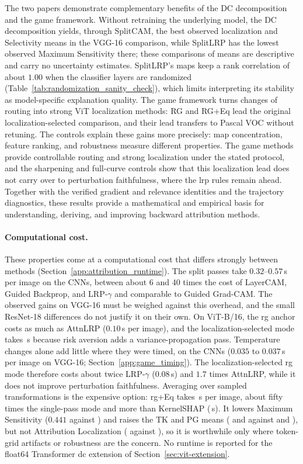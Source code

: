 The two papers demonstrate complementary benefits of the DC decomposition and the game framework. Without retraining the underlying model, the DC decomposition yields, through SplitCAM, the best observed localization and Selectivity means in the VGG-16 comparison, while SplitLRP has the lowest observed Maximum Sensitivity there; these comparisons of means are descriptive and carry no uncertainty estimates. SplitLRP's maps keep a rank correlation of about $1.00$ when the classifier layers are randomized (Table~\ref{tab:randomization_sanity_check}), which limits interpreting its stability as model-specific explanation quality. The game framework turns changes of routing into strong ViT localization methods: RG and RG+Eq lead the original localization-selected comparison, and their lead transfers to Pascal VOC without retuning. The controls explain these gains more precisely: map concentration, feature ranking, and robustness measure different properties. The game methods provide controllable routing and strong localization under the stated protocol, and the sharpening and full-curve controls show that this localization lead does not carry over to perturbation faithfulness, where the \ac{lrp} rules remain ahead. Together with the verified gradient and relevance identities and the trajectory diagnostics, these results provide a mathematical and empirical basis for understanding, deriving, and improving backward attribution methods.

\paragraph{Computational cost.}
These properties come at a computational cost that differs strongly between methods (Section~\ref{app:attribution_runtime}). The split passes take $0.32$--$0.57$\,s per image on the CNNs, between about 6 and 40 times the cost of LayerCAM, Guided Backprop, and LRP-$\gamma$ and comparable to Guided Grad-CAM. The observed gains on VGG-16 must be weighed against this overhead, and the small ResNet-18 differences do not justify it on their own. On ViT-B/16, the \ac{rg} anchor costs as much as AttnLRP ($0.10$\,s per image), and the localization-selected mode takes \vitRGlocTime\,s because risk aversion adds a variance-propagation pass. Temperature changes alone add little where they were timed, on the CNNs ($0.035$ to $0.037$\,s per image on VGG-16; Section~\ref{app:game_timing}). The localization-selected \ac{rg} mode therefore costs about twice LRP-$\gamma$ ($0.08$\,s) and $1.7$ times AttnLRP, while it does not improve perturbation faithfulness. Averaging over sampled transformations is the expensive option: \ac{rg}+Eq takes \vitRGEqTime\,s per image, about fifty times the single-pass mode and more than KernelSHAP (\vitSHAPTime\,s). It lowers Maximum Sensitivity ($0.441$ against \vitRGlocMaxS) and raises the TK and PG means (\vitRGEqlocTK{} and \vitRGEqlocPG{} against \vitRGlocTK{} and \vitRGlocPG), but not Attribution Localization (\vitRGEqlocAL{} against \vitRGlocAL), so it is worthwhile only where token-grid artifacts or robustness are the concern. No runtime is reported for the float64 Transformer \acs{dc} extension of Section~\ref{sec:vit-extension}.
